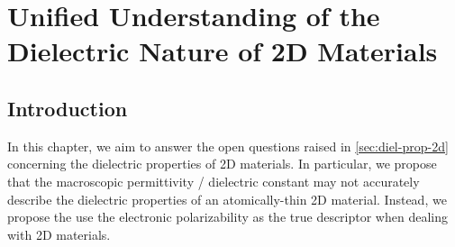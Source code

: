 \chapter{Unified Understanding of the Dielectric Nature of 2D Materials}
\label{ch:diel}
\renewcommand*\imgdir{img/diel/}


\vspace{1em}


\section{Introduction}
\label{sec:diel-introduction}

In this chapter, we aim to answer the open questions raised in
\autoref{sec:diel-prop-2d} concerning the dielectric properties of 2D
materials. In particular, we propose that the macroscopic permittivity
/ dielectric constant may not accurately describe the dielectric
properties of an atomically-thin 2D material. Instead, we propose the
use the electronic polarizability as the true descriptor when dealing
with 2D materials.


